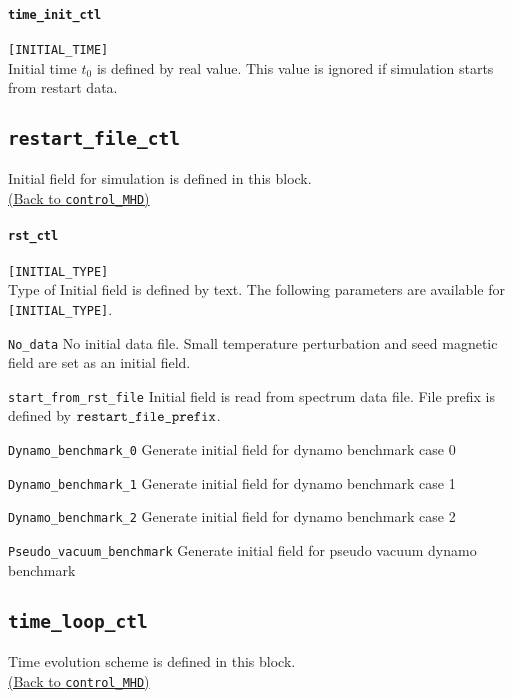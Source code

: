 \paragraph{\tt time\_init\_ctl}
\label{href_t:time_init_ctl}
\verb|[INITIAL_TIME]| \\
Initial time $t_{0}$ is defined by real value. This value is ignored if simulation starts from restart data.


\subsection{\tt restart\_file\_ctl}
\label{href_t:restart_file_ctl}
Initial field for simulation is defined in this block.\\
\hyperref[href_t:restart_file_prefix]{(Back to {\tt control\_MHD})}

\paragraph{\tt rst\_ctl}
\label{href_t:rst_ctl}
\verb|[INITIAL_TYPE]| \\
Type of Initial field is defined by text. The following parameters are available for \verb|[INITIAL_TYPE]|.
%
\begin{description}
\item{\tt No\_data}  No initial data file. Small temperature perturbation and seed magnetic field are set as an initial field.
\item{\tt start\_from\_rst\_file} Initial field is read from spectrum data file. File prefix is defined by \hyperref[href_t:restart_file_prefix]{$\mbox{\tt restart\_file\_prefix}$}.
\item{\tt Dynamo\_benchmark\_0}   Generate initial field for dynamo benchmark case 0
\item{\tt Dynamo\_benchmark\_1}   Generate initial field for dynamo benchmark case 1
\item{\tt Dynamo\_benchmark\_2}   Generate initial field for dynamo benchmark case 2
\item{\tt Pseudo\_vacuum\_benchmark} Generate initial field for pseudo vacuum dynamo benchmark
\end{description}
%

\subsection{\tt time\_loop\_ctl}
\label{href_t:time_loop_ctl}
Time evolution scheme is defined in this block. \\
\hyperref[href_i:time_loop_ctl]{(Back to {\tt control\_MHD})}

